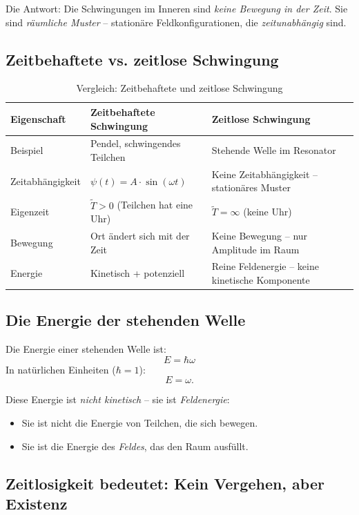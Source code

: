 \documentclass[11pt,a4paper]{article}
\begin{document}
	Die Antwort: Die Schwingungen im Inneren sind \emph{keine Bewegung in der Zeit}. 
	Sie sind \emph{räumliche Muster} -- stationäre Feldkonfigurationen, die \emph{zeitunabhängig} sind.
	
	\subsection{Zeitbehaftete vs. zeitlose Schwingung}
	
	\begin{table}[ht]
		\centering
		\caption{Vergleich: Zeitbehaftete und zeitlose Schwingung}
		\label{tab:zeitlose_schwingung}
		\begin{tabular}{lll}
			\toprule
			Eigenschaft & Zeitbehaftete Schwingung & Zeitlose Schwingung \\
			\midrule
			Beispiel & Pendel, schwingendes Teilchen & Stehende Welle im Resonator \\
			Zeitabhängigkeit & \(\psi(t) = A \cdot \sin(\omega t)\) & Keine Zeitabhängigkeit -- stationäres Muster \\
			Eigenzeit & \(\tilde{T} > 0\) (Teilchen hat eine Uhr) & \(\tilde{T} = \infty\) (keine Uhr) \\
			Bewegung & Ort ändert sich mit der Zeit & Keine Bewegung -- nur Amplitude im Raum \\
			Energie & Kinetisch + potenziell & Reine Feldenergie -- keine kinetische Komponente \\
			\bottomrule
		\end{tabular}
	\end{table}
	
	\subsection{Die Energie der stehenden Welle}
	
	Die Energie einer stehenden Welle ist:
	\[
	E = \hbar \omega
	\]
	In natürlichen Einheiten (\(\hbar = 1\)):
	\[
	E = \omega.
	\]
	
	Diese Energie ist \emph{nicht kinetisch} -- sie ist \emph{Feldenergie}:
	\begin{itemize}
		\item Sie ist nicht die Energie von Teilchen, die sich bewegen.
		\item Sie ist die Energie des \emph{Feldes}, das den Raum ausfüllt.
	\end{itemize}
	
	\subsection{Zeitlosigkeit bedeutet: Kein Vergehen, aber Existenz}
	
\end{document}
